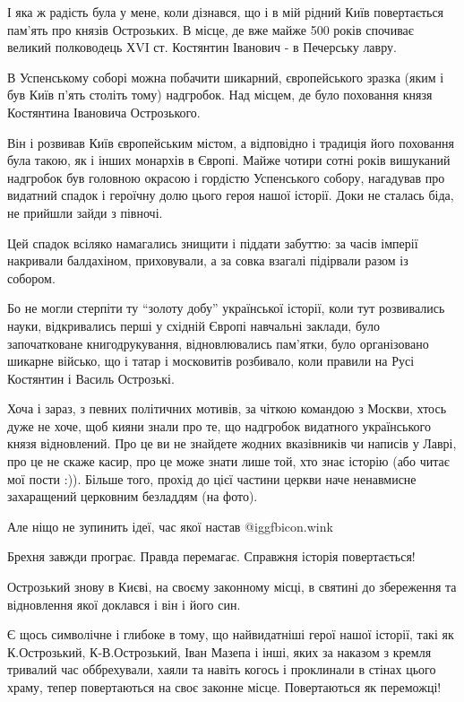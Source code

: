 І яка ж радість була у мене, коли дізнався, що і в мій рідний Київ повертається
пам’ять про князів Острозьких. В місце, де вже майже 500 років спочиває великий
полководець ХVI ст. Костянтин Іванович - в Печерську лавру.

В Успенському соборі можна побачити шикарний, європейського зразка (яким і був
Київ п’ять століть тому) надгробок. Над місцем, де було поховання князя
Костянтина Івановича Острозького. 

Він і розвивав Київ європейським містом, а відповідно і традиція його поховання
була такою, як і інших монархів в Європі. Майже чотири сотні років вишуканий
надгробок був головною окрасою і гордістю Успенського собору, нагадував про
видатний спадок і героїчну долю цього героя нашої історії. Доки не сталась
біда, не прийшли зайди з півночі.

Цей спадок всіляко намагались знищити і піддати забуттю: за часів імперії
накривали балдахіном, приховували, а за совка взагалі підірвали разом із
собором. 

Бо не могли стерпіти ту \enquote{золоту добу} української історії, коли тут
розвивались науки, відкривались перші у східній Європі навчальні заклади, було
започатковане книгодрукування, відновлювались пам’ятки, було організовано
шикарне військо, що і татар і московитів розбивало, коли правили на Русі
Костянтин і Василь Острозькі.  

Хоча і зараз, з певних політичних мотивів, за чіткою командою з Москви, хтось
дуже не хоче, щоб кияни знали про те, що надгробок видатного українського князя
відновлений. Про це ви не знайдете жодних вказівників чи написів у Лаврі, про
це не скаже касир, про це може знати лише той, хто знає історію (або читає мої
пости :)). Більше того, прохід до цієї частини церкви наче ненавмисне
захаращений церковним безладдям (на фото). 

Але ніщо не зупинить ідеї, час якої настав  @igg{fbicon.wink}  

Брехня завжди програє. Правда перемагає. Справжня історія повертається!

Острозький знову в Києві, на своєму законному місці, в святині до збереження та
відновлення якої доклався і він і його син. 

Є щось символічне і глибоке в тому, що найвидатніші герої нашої історії, такі
як К.Острозький, К-В.Острозький, Іван Мазепа і інші, яких за наказом з кремля
тривалий час оббрехували, хаяли та навіть когось і проклинали в стінах цього
храму, тепер повертаються на своє законне місце. Повертаються як переможці!

